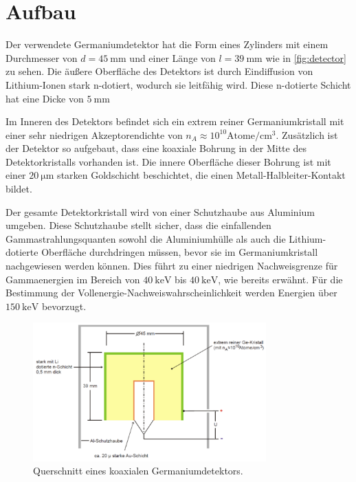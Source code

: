 \section{Aufbau}\label{sec:aufbau}
Der verwendete Germaniumdetektor hat die Form eines Zylinders mit einem Durchmesser von $d = \SI{45}{\milli\meter}$ und einer Länge von $l = \SI{39}{\milli\meter}$ wie in \autoref{fig:detector} zu sehen. Die äußere Oberfläche des Detektors ist durch Eindiffusion von Lithium-Ionen stark n-dotiert, wodurch sie leitfähig wird. Diese n-dotierte Schicht hat eine Dicke von $\SI{5}{\milli\meter}$

Im Inneren des Detektors befindet sich ein extrem reiner Germaniumkristall mit einer sehr niedrigen Akzeptorendichte von $ n_A \approx 10^{10} \mathrm{Atome/cm^3}$. Zusätzlich ist der Detektor so aufgebaut, dass eine koaxiale Bohrung in der Mitte des Detektorkristalls vorhanden ist. Die innere Oberfläche dieser Bohrung ist mit einer $\SI{20}{\micro\meter}$ starken Goldschicht beschichtet, die einen Metall-Halbleiter-Kontakt bildet.

Der gesamte Detektorkristall wird von einer Schutzhaube aus Aluminium umgeben. Diese Schutzhaube stellt sicher, dass die einfallenden Gammastrahlungsquanten sowohl die Aluminiumhülle als auch die Lithium-dotierte Oberfläche durchdringen müssen, bevor sie im Germaniumkristall nachgewiesen werden können. Dies führt zu einer niedrigen Nachweisgrenze für Gammaenergien im Bereich von $\SI{40}{\kilo\eV}$ bis $\SI{40}{\kilo\eV}$, wie bereits erwähnt. Für die Bestimmung der Vollenergie-Nachweiswahrscheinlichkeit werden Energien über $\SI{150}{\kilo\eV}$ bevorzugt.

\begin{figure}[h!]
    \centering
    \includegraphics[width=0.8\textwidth]{Ressourcen/detector.png} %
    \caption{Querschnitt eines koaxialen Germaniumdetektors.\cite{anleitung}}
    \label{fig:detector}
\end{figure}